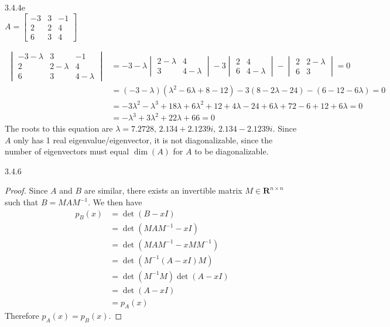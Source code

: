 \documentclass{article}
\theoremstyle{definition}
\begin{document}
	\begin{prob}{3.4.4e} $  $ \vspace{3mm} \\
		$ A = \begin{bmatrix} -3 & 3 & -1 \\ 2 & 2 & 4 \\ 6 & 3 & 4 \end{bmatrix} $
		
		\begin{align*}
			\begin{vmatrix} -3-\lambda & 3 & -1 \\ 2 & 2 - \lambda & 4 \\ 6 & 3 & 4-\lambda \end{vmatrix} &= -3-\lambda \begin{vmatrix} 2-\lambda & 4 \\ 3 & 4-\lambda \end{vmatrix} - 3 \begin{vmatrix} 2 & 4 \\ 6 & 4-\lambda \end{vmatrix} - \begin{vmatrix} 2 & 2-\lambda \\ 6 & 3 \end{vmatrix} = 0 \\
			&= (-3-\lambda) (\lambda^2 - 6\lambda + 8 - 12) - 3(8-2\lambda - 24) - (6-12-6\lambda) = 0 \\
			&= -3\lambda^2 - \lambda^3 + 18\lambda + 6\lambda^2 + 12 + 4\lambda - 24 + 6\lambda + 72 - 6 + 12 + 6\lambda = 0 \\
			&= -\lambda^3 + 3\lambda^2 + 22\lambda + 66 = 0
		\end{align*}
	The roots to this equation are $ \lambda = 7.2728, \,  2.134+2.1239i, \,  2.134-2.1239i $. Since $ A $ only has 1 real eigenvalue/eigenvector, it is not diagonalizable, since the number of eigenvectors must equal $ \dim(A) $ for $ A $ to be diagonalizable.
	\end{prob}    

	\begin{prob}{3.4.6} $  $
		\begin{proof}
			Since $ A $ and $ B $ are similar, there exists an invertible matrix $ M \in \mathbf{R}^{n\times n} $ such that $ B = MAM^{-1} $. We then have 
				\begin{align*}
					p_B(x) &= \det(B-xI) \\
					&= \det(MAM^{-1} - xI) \\
					&= \det(MAM^{-1} - xMM^{-1}) \\
					&= \det(M^{-1}(A-xI)M) \\
					&= \det(M^{-1} M) \det(A-xI) \\
					&= \det(A-xI) \\
					&= p_A(x)
				\end{align*}
			Therefore $ p_A(x) = p_B(x) $.
		\end{proof}
	\end{prob}
\end{document}
